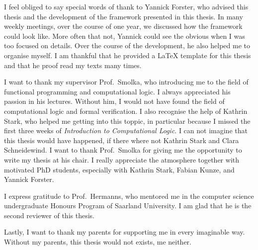 I feel obliged to say special words of thank to Yannick Forster, who advised this thesis and the development of the framework presented in this
thesis.  In many weekly meetings, over the course of one year, we discussed how the framework could look like.  More often that not, Yannick could see
the obvious when I was too focused on details.  Over the course of the development, he also helped me to organise myself.  I am thankful that he
provided a {\LaTeX} template for this thesis and that he proof read my texts many times.

I want to thank my supervisor Prof.~Smolka, who introducing me to the field of functional programming and computational logic.  I always appreciated
his passion in his lectures.  Without him, I would not have found the field of computational logic and formal verification.  I also recognise the help
of Kathrin Stark, who helped me getting into this toppic, in particular because I missed the first three weeks of \textit{Introduction to
  Computational Logic}.  I can not imagine that this thesis would have happened, if there where not Kathrin Stark and Clara Schneidewind.  I want to
thank Prof.~Smolka for giving me the opportunity to write my thesis at his chair.  I really appreciate the atmosphere together with motivated PhD
students, especially with Kathrin Stark, Fabian Kunze, and Yannick Forster.

I express gratitude to Prof.~Hermanns, who mentored me in the computer science undergraduate Honours Program of Saarland University.  I am glad that
he is the second reviewer of this thesis.

Lastly, I want to thank my parents for supporting me in every imaginable way.  Without my parents, this thesis would not exists, me neither.



